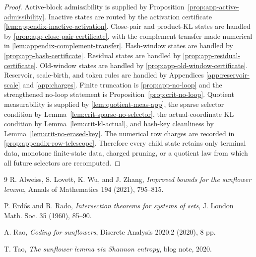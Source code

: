 \documentclass[11pt]{article}
\newcommand{\Cref}[1]{\ref{#1}}
\theoremstyle{remark}
\begin{document}
\begin{proof}
Active-block admissibility is supplied by Proposition~\ref{prop:app-active-admissibility}. Inactive states are routed by the activation certificate \Cref{lem:appendix-inactive-activation}.  Close-pair and product-KL states are handled by \Cref{prop:app-close-pair-certificate}, with the complement transfer made numerical in \Cref{lem:appendix-complement-transfer}.  Hash-window states are handled by \Cref{prop:app-hash-certificate}.  Residual states are handled by \Cref{prop:app-residual-certificate}.  Old-window states are handled by \Cref{prop:app-old-window-certificate}.  Reservoir, scale-birth, and token rules are handled by Appendices \ref{app:reservoir-scale} and \ref{app:charges}.  Finite truncation is \Cref{prop:app-no-loop} and the strengthened no-loop statement is Proposition~\ref{prop:crit-no-loop}.  Quotient measurability is supplied by \Cref{lem:quotient-meas-app}, the sparse selector condition by Lemma~\ref{lem:crit-sparse-no-selector}, the actual-coordinate KL condition by Lemma~\ref{lem:crit-kl-actual}, and hash-key cleanliness by Lemma~\ref{lem:crit-no-erased-key}.  The numerical row charges are recorded in \Cref{prop:appendix-row-telescope}.  Therefore every child state retains only terminal data, monotone finite-state data, charged pruning, or a quotient law from which all future selectors are recomputed.
\end{proof}


\begin{thebibliography}{9}
R. Alweiss, S. Lovett, K. Wu, and J. Zhang, \emph{Improved bounds for the sunflower lemma}, Annals of Mathematics 194 (2021), 795--815.

P. Erd\H{o}s and R. Rado, \emph{Intersection theorems for systems of sets}, J. London Math. Soc. 35 (1960), 85--90.

A. Rao, \emph{Coding for sunflowers}, Discrete Analysis 2020:2 (2020), 8 pp.

T. Tao, \emph{The sunflower lemma via Shannon entropy}, blog note, 2020.
\end{thebibliography}
\end{document}
